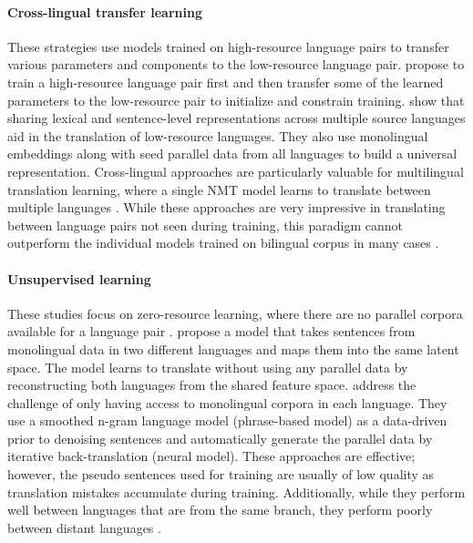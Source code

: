 \paragraph{Cross-lingual transfer learning}
These strategies use models trained on high-resource language pairs to transfer various parameters and components to the low-resource language pair. 
\citet{zoph-EtAl:2016:EMNLP2016} propose to train a high-resource language pair first and then transfer some of the learned parameters to the low-resource pair to initialize and constrain training. 
\citet{gu2018universal} show that sharing lexical and sentence-level representations across multiple source languages aid in the translation of low-resource languages. They also use monolingual embeddings along with seed parallel data from all languages to build a universal representation.
Cross-lingual approaches are particularly valuable for multilingual translation learning, where a single NMT model learns to translate between multiple languages \citep{firat-etal-2016-multi,johnson-etal-2017-googles,blackwood-etal-2018-multilingual,aharoni-etal-2019-massively}.
While these approaches are very impressive in translating between language pairs not seen during training, this paradigm cannot outperform the individual models trained on bilingual corpus in many cases \citep{johnson-etal-2017-googles}.


\paragraph{Unsupervised learning} 
These studies focus on zero-resource learning, where there are no parallel corpora available for a language pair \citep{yang-etal-2018-unsupervised,artetxe-etal-2018-unsupervised,artetxe2018iclr,artetxe-etal-2019-effective}.
\citet{lample2018unsupervised} propose a model that takes sentences from monolingual data in two different languages and maps them into the same latent space.
The model learns to translate without using any parallel data by reconstructing both languages from the shared feature space. 
\citet{lample-etal-2018-phrase} address the challenge of only having access to monolingual corpora in each language. 
They use a smoothed n-gram language model (phrase-based model) as a data-driven prior to denoising sentences and automatically generate the parallel data by iterative back-translation (neural model).
These approaches are effective; however, the pseudo sentences used for training are usually of low quality as translation mistakes accumulate during training. 
Additionally, while they perform well between languages that are from the same branch, they perform poorly between distant languages \citep{sun-etal-2020-knowledge}.

